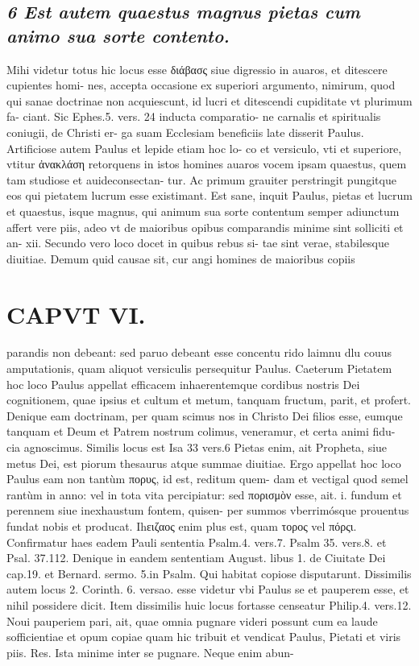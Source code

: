 \documentclass{article}
\begin{document}
\begin{pages}
\subsection*{\textit{6 Est autem quaestus magnus pietas cum animo sua sorte contento. }}\pstart Mihi videtur totus hic locus esse διάβασς siue digressio in auaros, et ditescere cupientes homi- nes, accepta occasione ex superiori argumento, nimirum, quod qui sanae doctrinae non acquiescunt, id lucri et ditescendi cupiditate vt plurimum fa- ciant. Sic Ephes.5. vers. 24 inducta comparatio- ne carnalis et spiritualis coniugii, de Christi er- ga suam Ecclesiam beneficiis late disserit Paulus. Artificiose autem Paulus et lepide etiam hoc lo- co et versiculo, vti et superiore, vtitur ἀνακλάση retorquens in istos homines auaros vocem ipsam quaestus, quem tam studiose et auideconsectan- tur. Ac primum grauiter perstringit pungitque eos qui pietatem lucrum esse existimant. Est sane, inquit Paulus, pietas et lucrum et quaestus, isque magnus, qui animum sua sorte contentum semper adiunctum affert vere piis, adeo vt de maioribus opibus comparandis minime sint solliciti et an- xii. Secundo vero loco docet in quibus rebus si- tae sint verae, stabilesque diuitiae. Demum quid causae sit, cur angi homines de maioribus copiis  \pend
\section*{CAPVT  VI. }
\marginpar{[ p.431 ]}\pstart parandis non debeant: sed paruo debeant esse concentu rido laimnu dlu couus amputationis, quam aliquot versiculis persequitur Paulus.  \pend\pstart Caeterum Pietatem hoc loco Paulus appellat efficacem inhaerentemque cordibus nostris Dei cognitionem, quae ipsius et cultum et metum, tanquam fructum, parit, et profert. Denique eam doctrinam, per quam scimus nos in Christo Dei filios esse, eumque tanquam et Deum et Patrem nostrum colimus, veneramur, et certa animi fidu- cia agnoscimus.  \pend\pstart Similis locus est Isa 33 vers.6 Pietas enim, ait Propheta, siue metus Dei, est piorum thesaurus atque summae diuitiae. Ergo appellat hoc loco Paulus eam non tantùm πορυς, id est, reditum quem- dam et vectigal quod semel rantùm in anno: vel in tota vita percipiatur: sed πορισμὸν esse, ait. i. fundum et perennem siue inexhaustum fontem, quisen- per summos vberrimósque prouentus fundat nobis et producat. Ihειζαος enim plus est, quam τορος vel πόρςι. Confirmatur haes eadem Pauli sententia Psalm.4. vers.7. Psalm 35. vers.8. et Psal. 37.112. Denique in eandem sententiam August. libus 1. de Ciuitate Dei cap.19. et Bernard. sermo. 5.in Psalm. Qui habitat copiose disputarunt.  \pend\pstart Dissimilis autem locus 2. Corinth. 6. versao. esse videtur vbi Paulus se et pauperem esse, et nihil possidere dicit. Item dissimilis huic locus fortasse censeatur Philip.4. vers.12. Noui pauperiem pari, ait, quae omnia pugnare videri possunt cum ea laude sofficientiae et opum copiae quam hic tribuit et vendicat Paulus, Pietati et viris piis. Res. Ista minime inter se pugnare. Neque enim abun-  \pend

\end{pages}
\end{document}
